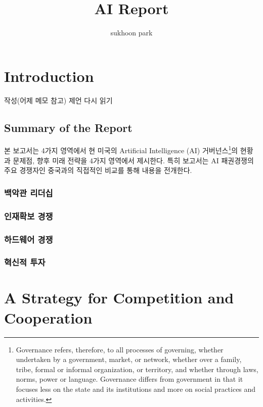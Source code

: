 \documentclass[11pt, a4]{article}
\begin{document}
\title{AI Report}
\author{sukhoon park}
\maketitle

\tableofcontents

\newpage
\section{Introduction}

작성(어제 메모 참고) 제언 다시 읽기

\subsection{Summary of the Report}

본 보고서는 4가지 영역에서 현 미국의 Artificial Intelligence (AI) 거버넌스\footnote{Governance refers, therefore, to all processes of governing, whether undertaken by a government, market, or network, whether over a family, tribe, formal or informal organization, or territory, and whether through laws, norms, power or language. Governance differs from government in that it focuses less on the state and its institutions and more on social practices and activities.\cite{bevir2012governance}}의 현황과 문제점, 향후 미래 전략을 4가지 영역에서 제시한다. 특히 보고서는 AI 패권경쟁의 주요 경쟁자인 중국과의 직접적인 비교를 통해 내용을 전개한다.

\subsubsection{백악관 리더십}

\subsubsection{인재확보 경쟁}

\subsubsection{하드웨어 경쟁}

\subsubsection{혁신적 투자}

\section{A Strategy for Competition and Cooperation}
\end{document}
